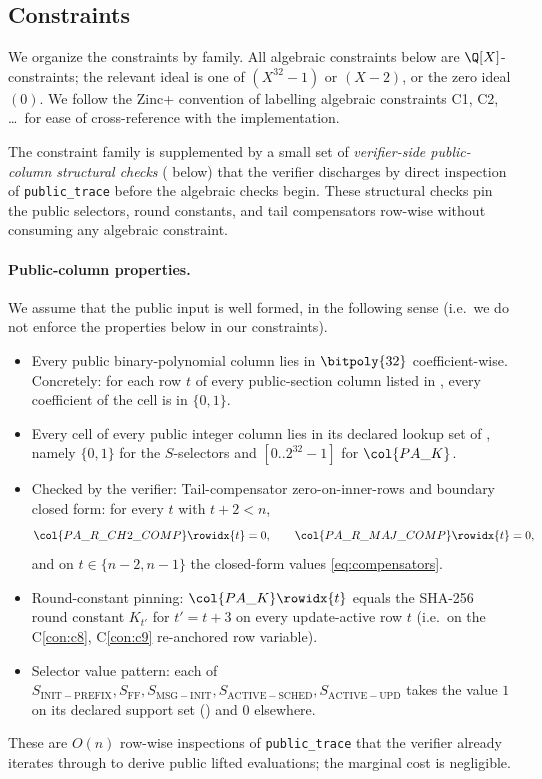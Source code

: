 \subsection{Constraints}\label{sec:constraints}

We organize the constraints by family. All algebraic constraints below
are $\Q[X]$-constraints; the relevant ideal is one of $(X^{32}-1)$ or
$(X-2)$, or the zero ideal $(0)$. We follow the Zinc+ convention of
labelling algebraic constraints C1, C2, \dots\ for ease of
cross-reference with the implementation.

The constraint family is supplemented by a small set of
\emph{verifier-side public-column structural checks}
( below) that the verifier discharges by
direct inspection of \texttt{public\_trace} before the algebraic
checks begin. These structural checks pin the public selectors,
round constants, and tail compensators row-wise without consuming
any algebraic constraint.

\label{cons:public-checks}
\paragraph{Public-column properties.}

We assume that the public input is well formed, in the following sense (i.e.\ we do not enforce the properties below in our constraints).
\begin{itemize}[leftmargin=2em]
  \item Every public binary-polynomial column lies in $\bitpoly{32}$
    coefficient-wise. Concretely: for each row $t$ of every
    public-section column listed in , every
    coefficient of the cell is in $\{0,1\}$.
  \item Every cell of every public integer column lies in its
    declared lookup set of , namely
    $\{0,1\}$ for the $S$-selectors and $[0..2^{32}-1]$ for
    $\col{PA\_K}$.
  \item Checked by the verifier: Tail-compensator zero-on-inner-rows and boundary closed form:
    for every $t$ with $t+2 < n$,
    \[
      \col{PA\_R\_CH2\_COMP}\rowidx{t} = 0,
      \qquad
      \col{PA\_R\_MAJ\_COMP}\rowidx{t} = 0,
    \]
    and on $t \in \{n-2, n-1\}$ the closed-form values \eqref{eq:compensators}.
  \item Round-constant pinning: $\col{PA\_K}\rowidx{t}$ equals the
    SHA-256 round constant $K_{t'}$ for $t' = t + 3$ on every
    update-active row $t$ (i.e.\ on the C\ref{con:c8}, C\ref{con:c9}
    re-anchored row variable).
  \item Selector value pattern: each of $S_{\mathrm{INIT-PREFIX}},
    S_{\mathrm{FF}}, S_{\mathrm{MSG-INIT}},
    S_{\mathrm{ACTIVE-SCHED}}, S_{\mathrm{ACTIVE-UPD}}$ takes the
    value $1$ on its declared support set () and
    $0$ elsewhere.
\end{itemize}
These are $O(n)$ row-wise inspections of \texttt{public\_trace} that
the verifier already iterates through to derive public lifted
evaluations; the marginal cost is negligible.

